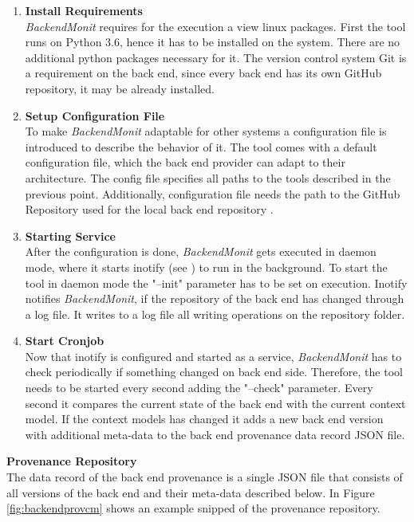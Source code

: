 \documentclass[draft,final]{vutinfth} %
\begin{document}
\begin{enumerate}
	\item \textbf{Install Requirements} \\
	\textit{BackendMonit} requires for the execution a view linux packages. First the tool runs on Python 3.6, hence it has to be installed on the system. There are no additional python packages necessary for it. The version control system Git is a requirement on the back end, since every back end has its own GitHub repository, it may be already installed. 
	
	\item \textbf{Setup Configuration File} \\
	To make \textit{BackendMonit} adaptable for other systems a configuration file is introduced to describe the behavior of it. The tool comes with a default configuration file, which the back end provider can adapt to their architecture. The config file specifies all paths to the tools described in the previous point. Additionally, configuration file needs the path to the GitHub Repository used for the local back end repository .      
	     
	\item \textbf{Starting Service} \\
	After the configuration is done, \textit{BackendMonit} gets executed in daemon mode, where it starts inotify (see \cite{inotifywait}) to run in the background. To start the tool in daemon mode the "--init" parameter has to be set on execution. Inotify notifies \textit{BackendMonit}, if the repository of the back end has changed through a log file. It writes to a log file all writing operations on the repository folder.    
	
	\item \textbf{Start Cronjob} \\
	Now that inotify is configured and started as a service, \textit{BackendMonit} has to check periodically if something changed on back end side. Therefore, the tool needs to be started every second adding the "--check" parameter. Every second it compares the current state of the back end with the current context model. If the context models has changed it adds a new back end version with additional meta-data to the back end provenance data record JSON file. 	 
\end{enumerate}

\textbf{Provenance Repository} \\
The data record of the back end provenance is a single JSON file that consists of all versions of the back end and their meta-data described below. In Figure \ref{fig:backendprovcm} shows an example snipped of the provenance repository.
\end{document}
